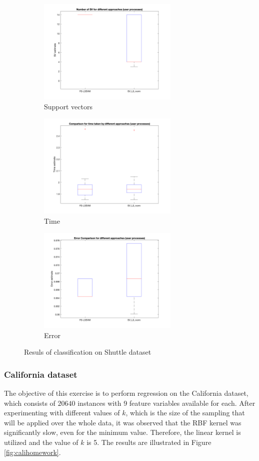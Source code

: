 \documentclass[a4paper, 11pt, one column]{article}
\begin{document}
\begin{figure}[H]
    \begin{subfigure}{0.33\textwidth}
        \includegraphics[width=6.7cm]{images/shuttle_sv_k5.png}
        \caption{Support vectors}
        \label{fig:4}
    \end{subfigure}\hfil %
    \begin{subfigure}{0.33\textwidth}
        \includegraphics[width=6.7cm]{images/shuttle_time_k5.png}
        \caption{Time}
        \label{fig:5}
    \end{subfigure}\hfil %
    \begin{subfigure}{0.33\textwidth}
        \includegraphics[width=6.7cm]{images/shuttle_error_k5.png}
        \caption{Error}
        \label{fig:5}
    \end{subfigure}\hfil %
    \caption{Resuls of classification on Shuttle dataset}
    \label{fig:shuttlehomew}
\end{figure}

\subsubsection{California dataset}
The objective of this exercise is to perform regression on the California dataset, which consists of $20640$ instances with 9 feature variables available for each. After experimenting with different values of $k$, which is the size of the sampling that will be applied over the whole data, it was observed that the RBF kernel was significantly slow, even for the minimum value. Therefore, the linear kernel is utilized and the value of $k$ is 5. The results are illustrated in Figure \ref{fig:calihomework}.
\end{document}
